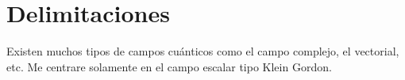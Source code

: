 \documentclass[../Main.tex]{subfiles}
\begin{document}
\section{Delimitaciones}
Existen muchos tipos de campos cuánticos como el campo complejo, el vectorial, etc. Me centrare solamente en el campo escalar tipo Klein Gordon.








\end{document}
